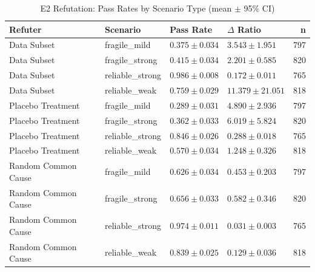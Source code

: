 \begin{table}
\caption{E2 Refutation: Pass Rates by Scenario Type (mean $\pm$ 95\% CI)}
\label{tab:e2_refutation}
\begin{tabular}{llllr}
\toprule
Refuter & Scenario & Pass Rate & $\Delta$ Ratio & n \\
\midrule
Data Subset & fragile_mild & $0.375 \pm 0.034$ & $3.543 \pm 1.951$ & 797 \\
Data Subset & fragile_strong & $0.415 \pm 0.034$ & $2.201 \pm 0.585$ & 820 \\
Data Subset & reliable_strong & $0.986 \pm 0.008$ & $0.172 \pm 0.011$ & 765 \\
Data Subset & reliable_weak & $0.759 \pm 0.029$ & $11.379 \pm 21.051$ & 818 \\
Placebo Treatment & fragile_mild & $0.289 \pm 0.031$ & $4.890 \pm 2.936$ & 797 \\
Placebo Treatment & fragile_strong & $0.362 \pm 0.033$ & $6.019 \pm 5.824$ & 820 \\
Placebo Treatment & reliable_strong & $0.846 \pm 0.026$ & $0.288 \pm 0.018$ & 765 \\
Placebo Treatment & reliable_weak & $0.570 \pm 0.034$ & $1.248 \pm 0.326$ & 818 \\
Random Common Cause & fragile_mild & $0.626 \pm 0.034$ & $0.453 \pm 0.203$ & 797 \\
Random Common Cause & fragile_strong & $0.656 \pm 0.033$ & $0.582 \pm 0.346$ & 820 \\
Random Common Cause & reliable_strong & $0.974 \pm 0.011$ & $0.031 \pm 0.003$ & 765 \\
Random Common Cause & reliable_weak & $0.839 \pm 0.025$ & $0.129 \pm 0.036$ & 818 \\
\bottomrule
\end{tabular}
\end{table}
